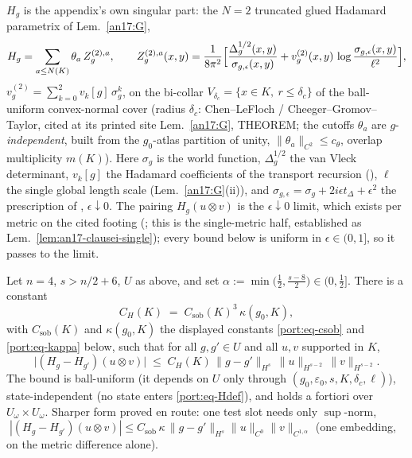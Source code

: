 $H_g$ is the appendix's own singular part: the $N{=}2$ truncated glued
Hadamard parametrix of Lem.~\ref{an17:G},
\begin{equation}\label{port:eq-Hdef}
  H_g=\sum_{a\le N(K)}\theta_a\,Z^{(2),a}_g,\qquad
  Z^{(2),a}_g(x,y)=\frac{1}{8\pi^2}\Bigl[\frac{\Delta_g^{1/2}(x,y)}
  {\sigma_{g,\epsilon}(x,y)}
  +v^{(2)}_g(x,y)\,\log\frac{\sigma_{g,\epsilon}(x,y)}{\ell^2}\Bigr],
\end{equation}
$v^{(2)}_g=\sum_{k=0}^{2}v_k[g]\,\sigma_g^k$, on the bi-collar
$V_{\delta_c}=\{x\in K,\ r\le\delta_c\}$ of the ball-uniform
convex-normal cover (radius $\delta_c$: Chen--LeFloch /
Cheeger--Gromov--Taylor, cited at its printed site Lem.~\ref{an17:G}, THEOREM;
the cutoffs $\theta_a$ are $g$-\emph{independent}, built from the
$g_0$-atlas partition of unity, $\|\theta_a\|_{C^2}\le c_\theta$,
overlap multiplicity $m(K)$). Here $\sigma_g$ is the world function,
$\Delta_g^{1/2}$ the van Vleck determinant, $v_k[g]$ the Hadamard
coefficients of the transport recursion (\cite[Thm.~2.1]{Moretti2003}),
$\ell$ the single global length scale (Lem.~\ref{an17:G}(ii)), and
$\sigma_{g,\epsilon}=\sigma_g+2i\epsilon t_\Delta+\epsilon^2$ the
prescription of \cite{KayWald1991}, $\epsilon\downarrow0$. The pairing
$H_g(u\otimes v)$ is the $\epsilon\downarrow0$ limit, which exists per
metric on the cited footing (\cite{Moretti2003,KayWald1991}; this is the
single-metric half, established as Lem.~\ref{lem:an17-clausei-single}); every bound
below is uniform in $\epsilon\in(0,1]$, so it passes to the limit.

\begin{theorem}\label{port:thm-M3}
Let $n=4$, $s>n/2+6$, $U$ as above, and set
$\alpha:=\min\bigl(\tfrac12,\tfrac{s-8}{2}\bigr)\in(0,\tfrac12]$. There
is a constant
\[
  C_H(K)\;=\;C_{\mathrm{sob}}(K)^3\,\kappa(g_0,K),
\]
with $C_{\mathrm{sob}}(K)$ and $\kappa(g_0,K)$ the displayed constants
\eqref{port:eq-csob} and \eqref{port:eq-kappa} below, such that for all
$g,g'\in U$ and all $u,v$ supported in $K$,
\begin{equation}\label{port:eq-clausei}
  \bigl|(H_g-H_{g'})(u\otimes v)\bigr|
  \;\le\;C_H(K)\,\|g-g'\|_{H^s}\,\|u\|_{H^{s-2}}\,\|v\|_{H^{s-2}}.
\end{equation}
The bound is ball-uniform (it depends on $U$ only through
$(g_0,\varepsilon_0,s,K,\delta_c,\ell)$), state-independent (no state
enters \eqref{port:eq-Hdef}), and holds a fortiori over
$U_\omega\times U_\omega$. Sharper form proved en route: one test slot
needs only $\sup$-norm,
$\;|(H_g-H_{g'})(u\otimes v)|\le C_{\mathrm{sob}}\,\kappa\,
\|g-g'\|_{H^s}\|u\|_{C^0}\|v\|_{C^{1,\alpha}}$
(one embedding, on the metric difference alone).
\end{theorem}

